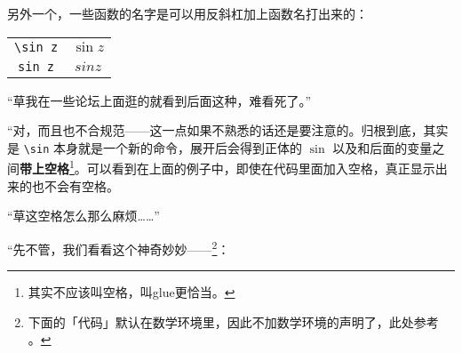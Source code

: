 另外一个，一些函数的名字是可以用反斜杠加上函数名打出来的：

\begin{center}
    \begin{tabular}{cc}
        \verb"\sin z" & $\sin z$ \\
        \verb"sin z"  & $sin z$  \\
    \end{tabular}
\end{center}

“草我在一些论坛上面逛的就看到后面这种，难看死了。”

“对，而且也不合规范——这一点如果不熟悉的话还是要注意的。归根到底，其实是 \verb"\sin" 本身就是一个新的命令，展开后会得到正体的 $\sin $ 以及和后面的变量之间\textbf{带上空格}\footnote{其实不应该叫空格，叫glue更恰当。}。可以看到在上面的例子中，即使在代码里面加入空格，真正显示出来的也不会有空格。

“草这空格怎么那么麻烦……”

“先不管，我们看看这个神奇妙妙——\footnote{下面的「代码」默认在数学环境里，因此不加数学环境的声明了，此处参考 \textcite[Symbols defined by unicode-math]{WillRobertson} 。}：

